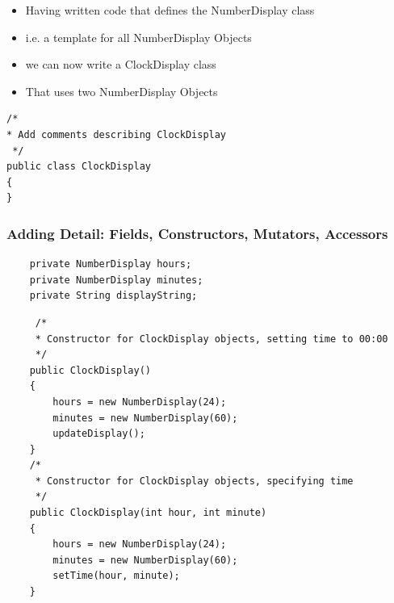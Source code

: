 \documentclass{beamer}
\begin{document}
\begin{frame}

\begin{itemize}
\item Having written code that defines the NumberDisplay class
\item i.e. a template for all NumberDisplay Objects
\item we can now write a ClockDisplay class 
\item That uses two NumberDisplay Objects
\end{itemize}

\end{frame}

\begin{frame}[fragile]

\tiny
\begin{block}{}
\begin{lstlisting}
/*
* Add comments describing ClockDisplay
 */
public class ClockDisplay
{
}
\end{lstlisting}
\end{block}

\end{frame}

\begin{frame}[fragile]
\frametitle{Adding Detail: Fields, Constructors, Mutators, Accessors}
\begin{block}{}
\begin{lstlisting}
    private NumberDisplay hours;
    private NumberDisplay minutes;
    private String displayString;    
\end{lstlisting}
\end{block}

\end{frame}

\begin{frame}[fragile]
\begin{block}{}
\begin{lstlisting}
     /*
     * Constructor for ClockDisplay objects, setting time to 00:00
     */
    public ClockDisplay()
    {
        hours = new NumberDisplay(24);
        minutes = new NumberDisplay(60);
        updateDisplay();
    }
    /*
     * Constructor for ClockDisplay objects, specifying time
     */
    public ClockDisplay(int hour, int minute)
    {
        hours = new NumberDisplay(24);
        minutes = new NumberDisplay(60);
        setTime(hour, minute);
    }
\end{lstlisting}
\end{block}

\end{frame}
\end{document}
